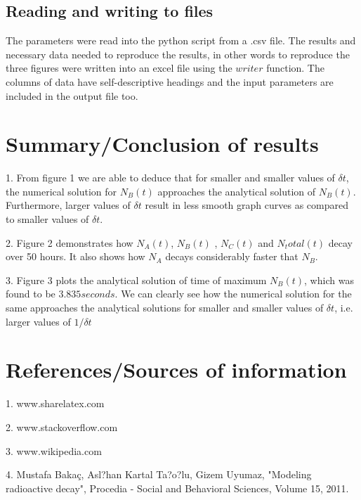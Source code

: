 \documentclass[11pt, oneside]{article}   	%
\begin{document}
\subsection{Reading and writing to files}

The parameters were read into the python script from a .csv file. The results and necessary data needed to reproduce the results, in other words to reproduce the three figures were written into an excel file using the $writer$  function. The columns of data have self-descriptive headings and the input parameters are included in the output file too. 

\section{Summary/Conclusion of results}

1. From figure 1 we are able to deduce that for smaller and smaller values of $\delta t$, the numerical solution for $N_B(t)$ approaches the analytical solution of $N_B(t)$. Furthermore, larger values of $\delta t$ result in less smooth graph curves as compared to smaller values of $\delta t$. 

2. Figure 2 demonstrates how $N_A(t)$, $N_B(t)$ , $N_C(t)$ and $N_total(t)$ decay over 50 hours. It also shows how $N_A$ decays considerably faster that $N_B$.

3. Figure 3 plots the analytical solution of time of maximum $N_B(t)$, which was found to be $3.835 seconds$. We can clearly see how the numerical solution for the same approaches the analytical solutions for smaller and smaller values of $\delta t$, i.e. larger values of $1/\delta t$  

\section{References/Sources of information}

1. www.sharelatex.com

2. www.stackoverflow.com

3. www.wikipedia.com

4. Mustafa Bakaç, Asl?han Kartal Ta?o?lu, Gizem Uyumaz, "Modeling radioactive decay", Procedia - Social and Behavioral Sciences, Volume 15, 2011.
\end{document}
